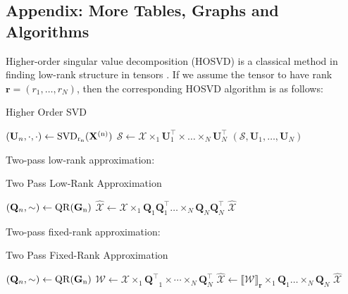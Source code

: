 \subsection{Appendix: More Tables, Graphs and Algorithms}

Higher-order singular value decomposition (HOSVD) is a classical method in finding low-rank structure in tensors \cite{de2000multilinear}. If we assume the tensor to have rank $\mathbf{r} = (r_1, \dots, r_N)$, then the corresponding HOSVD algorithm is as follows:  
\begin{algorithm}[!ht]
\caption{Higher Order SVD}\label{alg:hosvd}
  \begin{algorithmic}[2]
  \State $(\mathbf{U}_n, \cdot, \cdot) \leftarrow \rm{SVD}_{r_n}(\mathbf{X}^{(n)})$
  \EndFor
  \State $\mathscr{S} \leftarrow \mathscr{X}\times_1 \mathbf{U}_1^\top \times \dots \times_N \mathbf{U}_N^\top$
  \State \Return $(\mathscr{S},\mathbf{U}_1, \dots, \mathbf{U}_N)$
  \EndFunction
\end{algorithmic}
\end{algorithm}

Two-pass low-rank approximation: 
\begin{algorithm}[ht]
\caption{Two Pass Low-Rank Approximation}\label{alg:two_pass_low_rank_appro}
  \begin{algorithmic}[1]
    \State $(\mathbf{Q}_n, \sim) \leftarrow \rm{QR}(\mathbf{G}_n)$
   \EndFor
   \State $\hat{\mathscr{X}} \leftarrow \mathscr{X} \times_1 \mathbf{Q}_1\mathbf{Q}_1^\top \dots \times_N \mathbf{Q}_N\mathbf{Q}_N^\top$
   \State \Return $\hat{\mathscr{X}}$
   \EndFunction
\end{algorithmic}
\end{algorithm}

Two-pass fixed-rank approximation: 
\begin{algorithm}[ht] 
\begin{algorithmic}[1]
\caption{Two Pass Fixed-Rank Approximation}\label{alg:two_pass_fix_rank_appro}
\State $(\mathbf{Q}_n, \sim) \leftarrow \rm{QR}(\mathbf{G}_n)$
\EndFor
\State $\mathscr{W} \leftarrow \mathscr{X} \times_1 \mathbf{Q^\top}_1 \times \cdots \times_N \mathbf{Q}_N^\top$ 
\State $\hat{\mathscr{X}} \leftarrow \llbracket \mathscr{W} \rrbracket _{\mathbf{r}} \times_1 \mathbf{Q}_1 \dots \times_N \mathbf{Q}_N$
\State \Return $\hat{\mathscr{X}}$
\EndFunction
\end{algorithmic}
\end{algorithm}